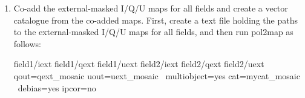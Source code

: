 \begin{enumerate}
\item Co-add the external-masked I/Q/U maps for all fields and create a vector catalogue from 
the co-added maps. First, create a text file holding the paths to the external-masked I/Q/U maps 
for all fields, and then run pol2map as follows:

 \begin{terminalv}
        field1/iext
        field1/qext
        field1/uext
        field2/iext
        field2/qext
        field2/uext
                  qout=qext_mosaic uout=uext_mosaic \
                  multiobject=yes cat=mycat_mosaic \
                  debias=yes ipcor=no
\end{terminalv}

\end{enumerate}
